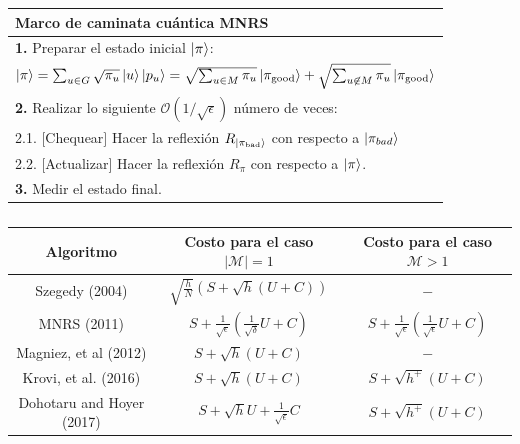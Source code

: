 \begin{center}
    \begin{tabular}{l}
    \hline \textbf{Marco de caminata cuántica MNRS} \\\hline 
    \textbf{1.} Preparar el estado inicial $\ket{\pi}$:\\
    $\ket{\pi}=\sum_{u\in G}\sqrt{\pi_u}\ket{u}\ket{p_u}=\sqrt{\sum_{u\in M}\pi_u}\ket{\pi_{\text{good}}}+\sqrt{\sum_{u\not\in M}\pi_u}\ket{\pi_{\text{good}}}$\\
    \textbf{2.} Realizar lo siguiente $\mathcal{O}(1/\sqrt{\epsilon})$  número de veces:\\
    2.1. $[$Chequear$]$ Hacer la reflexión $R_{\ket{\pi_{\text{bad}}}}$ con respecto a $\ket{\pi_{bad}}$\\
    2.2. $[$Actualizar$]$ Hacer la reflexión $R_{\pi}$ con respecto a $\ket{\pi}$.\\
    \textbf{3.} Medir el estado final.\\\hline
    \end{tabular}{}
\end{center}{}
\begin{table}[h]
    \centering
    \begin{tabular}{|c|c|c|}
    \hline  
    Algoritmo & Costo para el caso $|\mathcal{M}|=1$ & Costo para el caso $\mathcal{M}>1$ \\\hline\hline
    Szegedy\cite{szegedy2004quantum} (2004)& $\sqrt{\frac{h}{N}}(S+\sqrt{h}(U+C))$ & $-$ \\\hline   
    MNRS (2011)&$S+\frac{1}{\sqrt{\epsilon}}(\frac{1}{\sqrt{\delta}}U+C)$ & $S+\frac{1}{\sqrt{\epsilon}}(\frac{1}{\sqrt{\epsilon}}U+C)$ \\\hline
    Magniez, et al (2012) & $S+\sqrt{h}(U+C)$ & $-$\\\hline
    Krovi, et al. (2016)& $S+\sqrt{h}(U+C)$&$S+\sqrt{h^+}(U+C)$
    \\\hline
    Dohotaru and Hoyer (2017)&$S+\sqrt{h}U+\frac{1}{\sqrt{\epsilon}}C$&$S+\sqrt{h^+}(U+C)$\\\hline
    \end{tabular}
    \caption{\cite{shao}}
    \label{AlgoritmosBusqueda}
\end{table}{}
